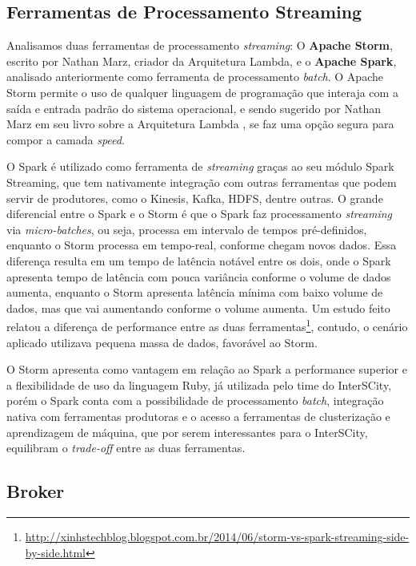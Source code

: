 
\subsection{Ferramentas de Processamento Streaming}

Analisamos duas ferramentas de processamento \textit{streaming}: O
\textbf{Apache Storm}, escrito por Nathan Marz, criador da Arquitetura
Lambda, e o \textbf{Apache Spark}, analisado anteriormente como ferramenta de
processamento \textit{batch}. O Apache Storm permite o uso de qualquer
linguagem de programação que interaja com a saída e entrada padrão do sistema
operacional, e sendo sugerido por Nathan Marz em seu livro sobre a Arquitetura
Lambda \cite{marz2015}, se faz uma opção segura para compor a camada
\textit{speed}.

O Spark é utilizado como ferramenta de \textit{streaming} graças ao seu módulo
Spark Streaming, que tem nativamente integração com outras ferramentas que
podem servir de produtores, como o Kinesis, Kafka, HDFS, dentre outras. O
grande diferencial entre o Spark e o Storm é que o Spark faz processamento
\textit{streaming} via \textit{micro-batches}, ou seja, processa em intervalo
de tempos pré-definidos, enquanto o Storm processa em tempo-real, conforme
chegam novos dados. Essa diferença resulta em um tempo de latência notável
entre os dois, onde o Spark apresenta tempo de latência com pouca variância
conforme o volume de dados aumenta, enquanto o Storm apresenta latência mínima
com baixo volume de dados, mas que vai aumentando conforme o volume aumenta.
Um estudo feito relatou a diferença de performance entre as duas
ferramentas\footnote{\url{http://xinhstechblog.blogspot.com.br/2014/06/storm-vs-spark-streaming-side-by-side.html}},
contudo, o cenário aplicado utilizava pequena massa de dados, favorável ao
Storm.

O Storm apresenta como vantagem em relação ao Spark a performance
superior e a flexibilidade de uso da linguagem Ruby, já utilizada pelo time
do InterSCity, porém o Spark conta com a possibilidade de processamento
\textit{batch}, integração nativa com ferramentas produtoras e o acesso a
ferramentas de clusterização e aprendizagem de máquina, que por serem
interessantes para o InterSCity, equilibram o \textit{trade-off} entre as
duas ferramentas.

\subsection{Broker}

